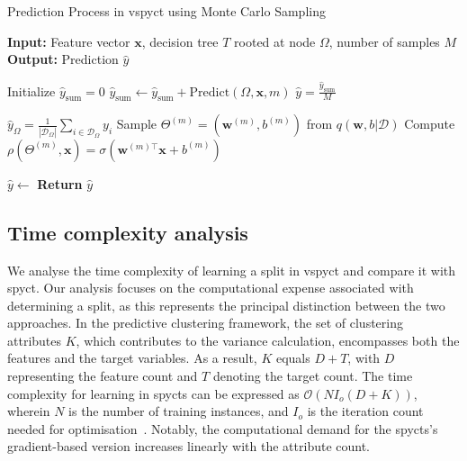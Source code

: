 \documentclass[3p,review,authoryear]{elsarticle}
\begin{document}
\begin{algorithm}[h!]
\caption{Prediction Process in \gls{vspyct} using Monte Carlo Sampling}
\label{alg:make_pred}
\begin{algorithmic}[1]

\State \textbf{Input:} Feature vector $\mathbf{x}$, decision tree $T$ rooted at node $\Omega$, number of samples $M$
\State \textbf{Output:} Prediction $\hat{y}$

    \State Initialize $\hat{y}_{\text{sum}} = 0$
        \State $\hat{y}_{\text{sum}} \gets \hat{y}_{\text{sum}} + \text{Predict}(\Omega, \mathbf{x}, m)$
    \EndFor
    \State \Return $\hat{y} = \frac{\hat{y}_{\text{sum}}}{M}$
\EndFunction

        \State \Return $\hat{y}_\Omega = \frac{1}{|\mathcal{D}_\Omega|} \sum_{i \in \mathcal{D}_\Omega} y_i$
    \Else
        \State Sample $\Theta^{(m)} = (\mathbf{w}^{(m)}, b^{(m)})$ from $q(\mathbf{w}, b|\mathcal{D})$
        \State Compute $\rho(\Theta^{(m)}, \mathbf{x}) = \sigma(\mathbf{w}^{(m)\top} \mathbf{x} + b^{(m)})$
            \State \Return {}
        \Else
            \State \Return {}
        \EndIf
    \EndIf
\EndFunction

\State \(\hat{y} \gets \) 
\State \textbf{Return} $\hat{y}$

\end{algorithmic}
\end{algorithm}

\subsection{Time complexity analysis}

We analyse the time complexity of learning a split in \gls{vspyct} and compare it with \gls{spyct}.
Our analysis focuses on the computational expense associated with determining a split, as this represents the principal distinction between the two approaches.
In the predictive clustering framework, the set of clustering attributes $K$, which contributes to the variance calculation, encompasses both the features and the target variables.
As a result, $K$ equals $D + T$, with $D$ representing the feature count and $T$ denoting the target count.
The time complexity for learning in \glspl{spyct} can be expressed as $\mathcal{O}(NI_o(D+K))$, wherein $N$ is the number of training instances, and $I_o$ is the iteration count needed for optimisation~\citep{Stepi_nik_2021}.
Notably, the computational demand for the \glspl{spyct}'s gradient-based version increases linearly with the attribute count.
\end{document}
